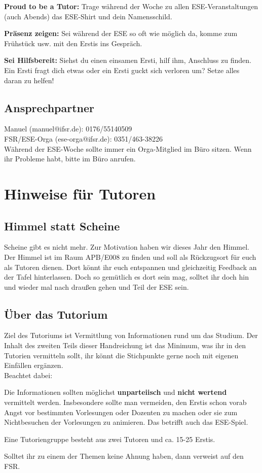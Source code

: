 \documentclass[a4paper,12pt]{report}
\begin{document}
\begin{itemize*}
	\item \textbf{Proud to be a Tutor:} Trage während der Woche zu allen ESE-Veranstaltungen (auch Abends) das ESE-Shirt und dein Namensschild.
	\item \textbf{Präsenz zeigen:} Sei während der ESE so oft wie möglich da, komme zum Frühstück usw. mit den Erstis ins Gespräch.
	\item \textbf{Sei Hilfsbereit:} Siehst du einen einsamen Ersti, hilf ihm, Anschluss zu finden. Ein Ersti fragt dich etwas oder ein Ersti guckt sich verloren um? Setze alles daran zu helfen!
\end{itemize*}

\section*{Ansprechpartner}
Manuel (manuel@ifsr.de): 0176/55140509 \\
FSR/ESE-Orga (ese-orga@ifsr.de): 0351/463-38226 \\

Während der ESE-Woche sollte immer ein Orga-Mitglied im Büro sitzen. Wenn ihr Probleme habt, bitte im Büro anrufen.

\tableofcontents
\chapter{Hinweise für Tutoren}
\section{Himmel statt Scheine}
Scheine gibt es nicht mehr. Zur Motivation haben wir dieses Jahr den Himmel. Der Himmel ist im Raum APB/E008 zu finden und soll als Rückzugsort für euch als Tutoren dienen. Dort könnt ihr euch entspannen und gleichzeitig Feedback an der Tafel hinterlassen. Doch so gemütlich es dort sein mag, solltet ihr doch hin und wieder mal nach draußen gehen und Teil der ESE sein.

\section{Über das Tutorium}
Ziel des Tutoriums ist Vermittlung von Informationen rund um das Studium. Der Inhalt des zweiten Teils dieser Handreichung ist das Minimum, was ihr in den Tutorien vermitteln sollt, ihr könnt die Stichpunkte gerne noch mit eigenen Einfällen ergänzen.\\
Beachtet dabei:
\begin{itemize*}
\item Die Informationen sollten möglichst \textbf{unparteiisch} und \textbf{nicht wertend} vermittelt werden.
Insbesondere sollte man vermeiden, den Erstis schon vorab Angst vor bestimmten Vorlesungen oder Dozenten zu machen oder sie zum Nichtbesuchen der Vorlesungen zu animieren. Das betrifft auch das ESE-Spiel.
\item Eine Tutoriengruppe besteht aus zwei Tutoren und ca. 15-25 Erstis.
\item Solltet ihr zu einem der Themen keine Ahnung haben, dann verweist auf den FSR.
\end{itemize*}
\end{document}
